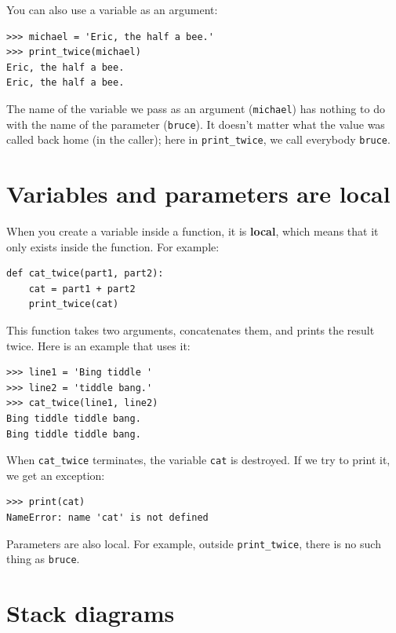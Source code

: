 \documentclass[10pt]{book}
\begin{document}
You can also use a variable as an argument:

\beforeverb
\begin{verbatim}
>>> michael = 'Eric, the half a bee.'
>>> print_twice(michael)
Eric, the half a bee.
Eric, the half a bee.
\end{verbatim}
\afterverb
%
The name of the variable we pass as an argument ({\tt michael}) has
nothing to do with the name of the parameter ({\tt bruce}).  It
doesn't matter what the value was called back home (in the caller);
here in \verb"print_twice", we call everybody {\tt bruce}.


\section{Variables and parameters are local}

When you create a variable inside a function, it is {\bf local},
which means that it only
exists inside the function.  For example:


\beforeverb
\begin{verbatim}
def cat_twice(part1, part2):
    cat = part1 + part2
    print_twice(cat)
\end{verbatim}
\afterverb
%
This function takes two arguments, concatenates them, and prints
the result twice.  Here is an example that uses it:


\beforeverb
\begin{verbatim}
>>> line1 = 'Bing tiddle '
>>> line2 = 'tiddle bang.'
>>> cat_twice(line1, line2)
Bing tiddle tiddle bang.
Bing tiddle tiddle bang.
\end{verbatim}
\afterverb
%
When \verb"cat_twice" terminates, the variable {\tt cat}
is destroyed.  If we try to print it, we get an exception:


\beforeverb
\begin{verbatim}
>>> print(cat)
NameError: name 'cat' is not defined
\end{verbatim}
\afterverb
%
Parameters are also local.
For example, outside \verb"print_twice", there is no
such thing as {\tt bruce}.


\section{Stack diagrams}
\label{stackdiagram}
\end{document}
